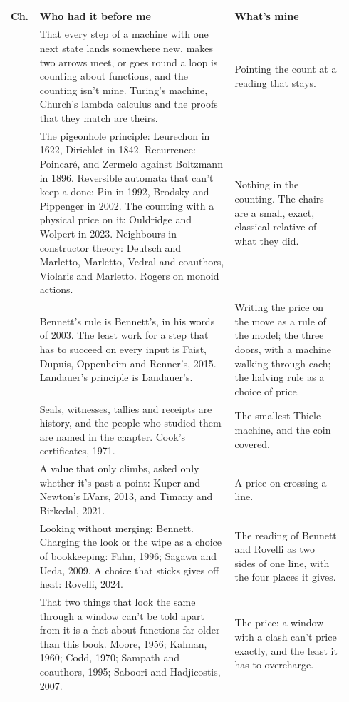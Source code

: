 \documentclass[11pt,twoside]{article}
\theoremstyle{thielethm}
\theoremstyle{thieledef}
\theoremstyle{thieledef}
\theoremstyle{thieledef}
\theoremstyle{thielethm}
\theoremstyle{thieleobs}
\theoremstyle{thielethm}
\begin{document}
\begingroup\small
\begin{longtable}{@{}>{\raggedright\arraybackslash}p{0.07\linewidth}>{\raggedright\arraybackslash}p{0.55\linewidth}>{\raggedright\arraybackslash}p{0.32\linewidth}@{}}
\toprule
\textbf{Ch.} & \textbf{Who had it before me} & \textbf{What's mine} \\
\midrule
\endhead
\bottomrule
\endlastfoot
1 & That every step of a machine with one next state lands somewhere new, makes two arrows meet, or goes round a loop is counting about functions, and the counting isn't mine. Turing's machine, Church's lambda calculus and the proofs that they match are theirs. & Pointing the count at a reading that stays. \\
2 & The pigeonhole principle: Leurechon in 1622, Dirichlet in 1842. Recurrence: Poincar\'e, and Zermelo against Boltzmann in 1896. Reversible automata that can't keep a done: Pin in 1992, Brodsky and Pippenger in 2002. The counting with a physical price on it: Ouldridge and Wolpert in 2023. Neighbours in constructor theory: Deutsch and Marletto, Marletto, Vedral and coauthors, Violaris and Marletto. Rogers on monoid actions. & Nothing in the counting. The chairs are a small, exact, classical relative of what they did. \\
3 & Bennett's rule is Bennett's, in his words of 2003. The least work for a step that has to succeed on every input is Faist, Dupuis, Oppenheim and Renner's, 2015. Landauer's principle is Landauer's. & Writing the price on the move as a rule of the model; the three doors, with a machine walking through each; the halving rule as a choice of price. \\
4 & Seals, witnesses, tallies and receipts are history, and the people who studied them are named in the chapter. Cook's certificates, 1971. & The smallest Thiele machine, and the coin covered. \\
5 & A value that only climbs, asked only whether it's past a point: Kuper and Newton's LVars, 2013, and Timany and Birkedal, 2021. & A price on crossing a line. \\
6 & Looking without merging: Bennett. Charging the look or the wipe as a choice of bookkeeping: Fahn, 1996; Sagawa and Ueda, 2009. A choice that sticks gives off heat: Rovelli, 2024. & The reading of Bennett and Rovelli as two sides of one line, with the four places it gives. \\
7 & That two things that look the same through a window can't be told apart from it is a fact about functions far older than this book. Moore, 1956; Kalman, 1960; Codd, 1970; Sampath and coauthors, 1995; Saboori and Hadjicostis, 2007. & The price: a window with a clash can't price exactly, and the least it has to overcharge. \\

\end{longtable}
\end{document}
